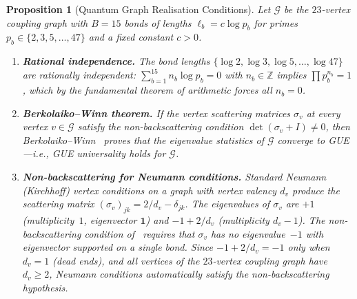 \documentclass[11pt,a4paper]{article}
\theoremstyle{plain}
\newtheorem{proposition}[theorem]{Proposition}
\theoremstyle{remark}
\newcommand{\Z}{\mathbb{Z}}
\begin{document}
\begin{proposition}[Quantum Graph Realisation Conditions]
\label{prop:quantum-graph}
Let $\mathcal{G}$ be the $23$-vertex coupling graph with $B=15$
bonds of lengths $\ell_b = c\log p_b$ for primes
$p_b\in\{2,3,5,\ldots,47\}$ and a fixed constant $c>0$.
\begin{enumerate}[nosep,label=\textup{(\roman*)}]
  \item \textbf{Rational independence.}  The bond lengths
        $\{\log 2,\log 3,\log 5,\ldots,\log 47\}$ are rationally
        independent: $\sum_{b=1}^{15} n_b \log p_b = 0$ with
        $n_b\in\Z$ implies $\prod p_b^{n_b}=1$, which by the
        fundamental theorem of arithmetic forces all $n_b=0$.
  \item \textbf{Berkolaiko--Winn theorem.}  If the vertex scattering
        matrices $\sigma_v$ at every vertex $v\in\mathcal{G}$
        satisfy the \emph{non-backscattering condition}
        $\det(\sigma_v + I)\neq 0$, then
        Berkolaiko--Winn~\cite{berkolaiko-winn2010} proves
        that the eigenvalue statistics of $\mathcal{G}$ converge
        to GUE---i.e., GUE universality holds for
        $\mathcal{G}$.
  \item \textbf{Non-backscattering for Neumann conditions.}
        Standard Neumann (Kirchhoff) vertex conditions on a graph
        with vertex valency $d_v$ produce the scattering matrix
        $(\sigma_v)_{jk} = 2/d_v - \delta_{jk}$.
        The eigenvalues of $\sigma_v$ are $+1$ (multiplicity~$1$,
        eigenvector $\mathbf{1}$) and $-1+2/d_v$ (multiplicity
        $d_v-1$).  The non-backscattering condition
        of~\cite{berkolaiko-winn2010} requires that $\sigma_v$ has
        no eigenvalue~$-1$ with eigenvector supported on a single
        bond.  Since $-1+2/d_v = -1$ only when $d_v=1$ (dead ends),
        and all vertices of the $23$-vertex coupling graph have
        $d_v\geq 2$, Neumann conditions automatically satisfy
        the non-backscattering hypothesis.
\end{enumerate}
\end{proposition}
\end{document}
